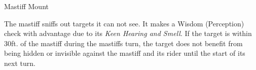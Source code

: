 \documentclass[letterpaper,twocolumn,openany,nodeprecatedcode]{dndbook}
\begin{document}
\begin{DndMonster}[float*=b,width=\textwidth + 8pt]{Mastiff Mount}
\begin{multicols}{2}
    \DndMonsterAttack[
      name=Bite Down,
      distance=melee, %
      mod={+1 + PB},
      dmg=\DndDice{2d4 + 1},
      dmg-type=piercing,
      extra={. The target is grappled (escape DC 9 + PB). Until this grapple ends, the target is restrained and the Mastiff can use its action to deal 9 (2d4 + 1) piercing damage. The mastiff can grapple only one target at a time}
    ]

    The mastiff sniffs out targets it can not see. It makes a Wisdom (Perception) check with advantage due to its \textit{Keen Hearing and Smell}. If the target is within 30ft. of the mastiff during the mastiffs turn, the target does not benefit from being hidden or invisible against the mastiff and its rider until the start of its next turn.

  \end{multicols}
\end{DndMonster}
\end{document}
